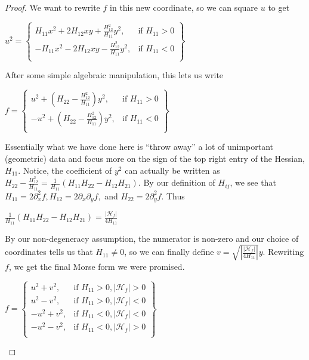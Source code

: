 \documentclass[12pt]{article}
\newcommand{\cH}{{\mathcal H}}
\theoremstyle{definition}
\begin{document}
\begin{proof}
	We want to rewrite $f$ in this new coordinate, so we can square $u$ to get 
	\begin{center}
		$u^2= 
		\left\{
			\begin{array}{lr}
				H_{11}x^2+2H_{12}xy+\frac{H_{12}^2}{H_{11}}y^2, & \text{if } H_{11}>0\\
				-H_{11}x^2-2H_{12}xy-\frac{H_{12}^2}{H_{11}}y^2, & \text{if } H_{11}<0\\
			\end{array}
		\right\}$
\end{center}
	After some simple algebraic manipulation, this lets us write 
	\begin{center}
		$f= 
		\left\{
			\begin{array}{lr}
				u^2+\left(H_{22}-\frac{H_{12}^2}{H_{11}}\right)y^2, & \text{if } H_{11}>0\\
				-u^2+\left(H_{22}-\frac{H_{12}^2}{H_{11}}\right)y^2, & \text{if } H_{11}<0\\
			\end{array}
		\right\}$
\end{center}
	Essentially what we have done here is ``throw away'' a lot of unimportant (geometric) data and focus more on the sign of the top right entry of the Hessian, $H_{11}$.
	Notice, the coefficient of $y^2$ can actually be written as 
	$H_{22}-\frac{H_{12}^2}{H_{11}}=\frac{1}{H_{11}}\left(H_{11}H_{22}-H_{12}H_{21}\right)$. By our definition of $H_{ij}$, we see that $H_{11} = 2\partial_x^2f,H_{12} = 2\partial_x\partial_yf,$ and $H_{22} = 2\partial_y^2f$. Thus 
	\begin{center}
		$\frac{1}{H_{11}}\left(H_{11}H_{22}-H_{12}H_{21}\right) = \frac{|\cH_f|}{4H_{11}}$ 
	\end{center}
	By our non-degeneracy assumption, the numerator is non-zero and our choice of coordinates tells us that $H_{11}\neq0$, so we can finally define $v = \sqrt{|\frac{|\cH_f|}{4H_{11}}|}y$. Rewriting $f$, we get the final Morse form we were promised.
	\begin{center}
		$f= 
		\left\{
			\begin{array}{lr}
				u^2+v^2, & \text{if } H_{11}>0, |\cH_f|>0\\
				u^2-v^2, & \text{if } H_{11}>0, |\cH_f|<0\\
				-u^2+v^2, & \text{if } H_{11}<0, |\cH_f|<0\\
				-u^2-v^2, & \text{if } H_{11}<0, |\cH_f|>0\\
			\end{array}
		\right\}$
	\end{center}

\end{proof}
\end{document}
